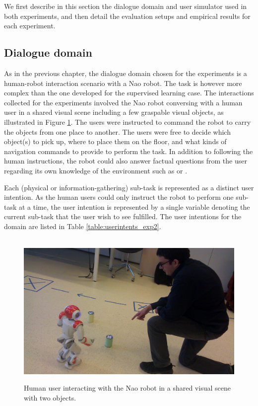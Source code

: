 We first describe in this section the dialogue domain and user simulator used in both experiments, and then detail the evaluation setups and empirical results for each experiment. 

\subsection{Dialogue domain}
\label{sec:exp2_dd}

As in the previous chapter, the dialogue domain chosen for the experiments is a human-robot interaction scenario with a Nao robot.  The task is however more complex than the one developed for the supervised learning case.  The interactions collected for the experiments involved the Nao robot conversing with a human user in a shared visual scene including a few graspable visual objects, as illustrated in Figure \ref{fig:naochap6}.  The users were instructed to command the robot to carry the objects from one place to another. The users were free to decide which object(s) to pick up, where to place them on the floor, and what kinds of navigation commands to provide to perform the task.  In addition to following the human instructions, the robot could also answer factual questions from the user regarding its own knowledge of the environment such as  or . 

Each (physical or information-gathering) sub-task is represented as a distinct user intention. As the human users could only instruct the robot to perform one sub-task at a time, the user intention is represented by a single variable denoting the current sub-task that the user wish to see fulfilled.  The user intentions for the domain are listed in Table \ref{table:userintents_exp2}. 

\begin{figure}[h]
$\phantom{a}$ \\[2mm]
\centering
\includegraphics[scale=0.12]{imgs/jonathon2.jpg}
\caption{Human user interacting with the Nao robot in a shared visual scene with two objects.}
\label{fig:naochap6}
\end{figure}

